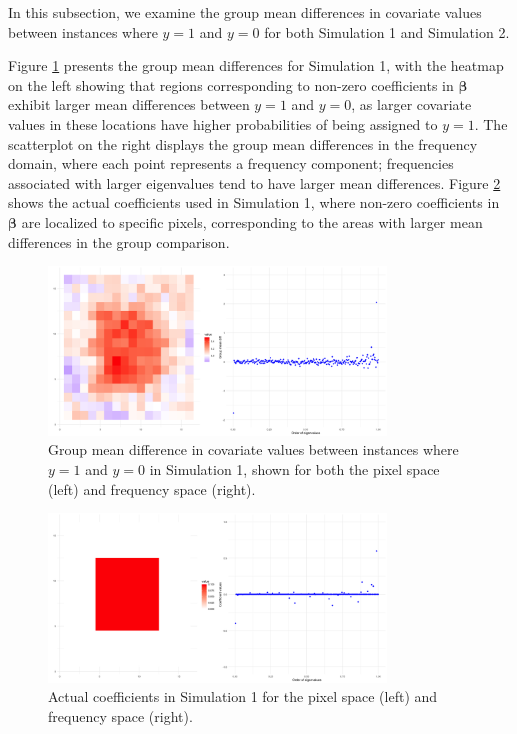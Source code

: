 \documentclass[12pt]{article}
\begin{document}
In this subsection, we examine the group mean differences in covariate values between instances where \( y = 1 \) and \( y = 0 \) for both Simulation 1 and Simulation 2.

Figure \ref{fig:group_diff1} presents the group mean differences for Simulation 1, with the heatmap on the left showing that regions corresponding to non-zero coefficients in \( \boldsymbol{\beta} \) exhibit larger mean differences between \( y = 1 \) and \( y = 0 \), as larger covariate values in these locations have higher probabilities of being assigned to \( y = 1 \). The scatterplot on the right displays the group mean differences in the frequency domain, where each point represents a frequency component; frequencies associated with larger eigenvalues tend to have larger mean differences. Figure \ref{fig:coefs_sim1} shows the actual coefficients used in Simulation 1, where non-zero coefficients in \( \boldsymbol{\beta} \) are localized to specific pixels, corresponding to the areas with larger mean differences in the group comparison.

\begin{figure}[h!]
	\centering
  \includegraphics[width=0.8\textwidth, height=0.35\textwidth]{group_mean_diff_sim1.png}
	\caption{Group mean difference in covariate values between instances where \( y = 1 \) and \( y = 0 \) in Simulation
		1, shown for both the pixel space (left) and frequency space (right).}
	\label{fig:group_diff1}
\end{figure}

\begin{figure}[h!]
	\centering
	\includegraphics[width=0.8\textwidth, height=0.35\textwidth]{actual_coefs_sim1.png}
	\caption{Actual coefficients in Simulation 1 for the pixel space (left) and frequency space (right).}
	\label{fig:coefs_sim1}
\end{figure}
\end{document}
